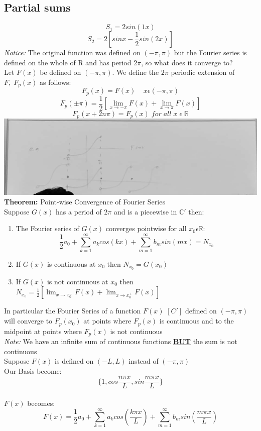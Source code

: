 \documentclass[11pt]{article}
\theoremstyle{definition}
\newcommand{\C}{\mathbb{C}}
\newcommand{\R}{\mathbb{R}}
\begin{document}
\subsection{Partial sums}
$$S_1 = 2sin(1x)$$
$$S_2 = 2[sinx - \frac{1}{2}sin(2x)]$$
\newpage
\textit{Notice:} The original function was defined on $(-\pi, \pi)$ but the Fourier series is defined on the whole of R and has period $2\pi$, so what does it converge to?\\
Let $F(x)$ be defined on $(-\pi, \pi)$. We define the $2\pi$ periodic extension of $F,\; F_p(x)$ as follows:
    $$F_p(x) = F(x)\;\;\;\; x \epsilon (-\pi, \pi)$$
    $$F_p(\pm\pi) = \frac{1}{2} [\lim_{x \to -\pi}F(x) + \lim_{x \to \pi}F(x)]$$
    $$F_p(x+2n\pi) = F_p(x)\; for\; all\; x\;\epsilon\; \R$$
    \includegraphics[width=\textwidth]{fourier1.jpg}\\

\textbf{Theorem:} Point-wise Convergence of Fourier Series\\
Suppose $G(x)$ has a period of $2\pi$ and is a piecewise in $\C'$ then: 
\begin{enumerate}[topsep=-10pt]
    \item The Fourier series of $G(x)$ converges pointwise for all $x_0 \epsilon \R$:
    $$\frac{1}{2}a_0 + \sum ^\infty_{k=1}a_kcos(kx) + \sum ^\infty_{m=1}b_msin(mx) = N_{x_0}$$
    \item If $G(x)$ is continuous at $x_0$ then $N_{x_0} = G(x_0)$
    \item If $G(x)$ is not continuous at $x_0$ then $N_{x_0} = \frac{1}{2} [\lim_{x \to x_0^-}F(x) + \lim_{x \to x_0^+}F(x)]$
\end{enumerate}
In particular the Fourier Series of a function $F(x)$   $[C']$ defined on $(-\pi, \pi)$ will converge to $F_p(x_0)$ at points where $F_p(x)$ is continuous and to the midpoint at points where $F_p(x)$ is not continuous\\
\textit{Note:} We have an infinite sum of continuous functions \textbf{\underline{BUT}} the sum is not continuous\\
Suppose $F(x)$ is defined on $(-L, L)$ instead of $(-\pi, \pi)$\\
Our Basis become: $$\{1, cos\frac{n\pi x}{L}, sin\frac{m\pi x}{L}\}$$\\
$F(x)$ becomes: $$F(x) = \frac{1}{2}a_0 + \sum ^\infty_{k=1}a_kcos(\frac{k \pi x}{L}) + \sum ^\infty_{m=1}b_msin(\frac{m \pi x}{L})$$
\end{document}
